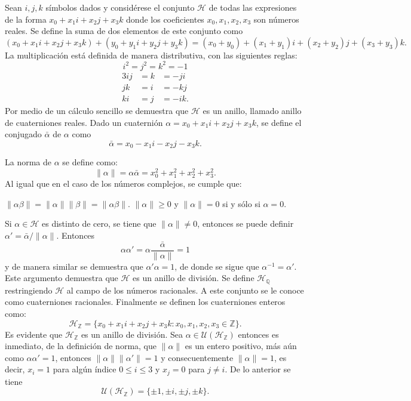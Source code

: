 \begin{ejemplo}
Sean $i,j,k$ símbolos dados y considérese el conjunto $\mathcal{H}$ de todas las expresiones de la forma $x_0 + x_1i+x_2j+x_3k$ donde los coeficientes $x_0,x_1,x_2,x_3$ son números reales.
Se define la suma de dos elementos de este conjunto como \[ (x_0 + x_1i+x_2j+x_3k)+(y_0 + y_1i+y_2j+y_3k) = (x_0 + y_0) + (x_1 + y_1)i + (x_2+y_2)j + (x_3+y_3)k.  \] La multiplicación está definida de manera distributiva, con las siguientes reglas:
\begin{equation*}
i^2 = j^2 = k^2 =-1
\end{equation*}
\vspace*{-5.1em}
\begin{alignat*}{3}
ij &= k &= -ji\\
jk &= i &= -kj\\
ki &= j &= -ik.
\end{alignat*}
 \indent Por medio de un cálculo sencillo se demuestra que $\mathcal{H}$ es un anillo, llamado anillo de cuaterniones reales. Dado un cuaternión $\alpha = x_0 + x_1i + x_2j + x_3k$, se define el conjugado $\bar{\alpha}$ de $\alpha$ como \[ \bar{\alpha} = x_0-x_1i - x_2j-x_3k. \] 
 
 La norma de $\alpha$ se define como: \[ \lVert \alpha \rVert = \alpha\bar{\alpha} = x_0 ^2 + x_1^2 + x_ 2^2 + x_ 3^2. \]
Al igual que en el caso de los números complejos, se cumple que:
\begin{bulletList}
\newItem $\lVert \alpha\beta \rVert = \lVert \alpha \rVert \lVert \beta \rVert = \lVert \alpha\beta \rVert$.
\newItem $\lVert \alpha \rVert \geq 0$ y $\lVert \alpha \rVert  = 0 $ si y sólo si $\alpha = 0 $.
\end{bulletList}

Si $\alpha \in \mathcal{H}$ es distinto de cero, se tiene que $\lVert \alpha \rVert \neq 0$, entonces se puede definir $\alpha' = \bar{\alpha}/\lVert \alpha \rVert$. Entonces \[ \alpha\alpha'= \alpha \frac{\bar{\alpha}}{\lVert \alpha \rVert} = 1 \] y de manera similar se demuestra que $\alpha'\alpha = 1$, de donde se sigue que $\alpha^{-1} = \alpha'$. Este argumento demuestra que $\mathcal{H}$ es un anillo de división.
Se define $\mathcal{H}_{\mathds{Q}}$ restringiendo $\mathcal{H}$ al campo de los números racionales. A este conjunto se le conoce como cuaterniones racionales.
Finalmente se definen los cuaterniones enteros como: \[ \mathcal{H}_{\mathds{Z}} = \{ x_0 + x_1i + x_2j + x_3k \colon x_0, x_1, x_2, x_3 \in \mathds{Z} \}. \]
\indent Es evidente que $\mathcal{H}_{\mathds{Z}}$ es un anillo de división.
Sea $\alpha \in \mathcal{U}(\mathcal{H}_{\mathds{Z}})$ entonces es inmediato, de la definición de norma, que $\lVert \alpha \rVert$ es un entero positivo, más aún como $\alpha\alpha'= 1$, entonces $\lVert \alpha \rVert \lVert \alpha'\rVert = 1$ y consecuentemente $\lVert \alpha \rVert = 1$, es decir, $x_i = 1$ para algún índice $0\leq i \leq 3 $ y $x_j = 0 $ para $j \neq i$. De lo anterior se tiene \[ \mathcal{U}(\mathcal{H}_{\mathds{Z}}) = \{ \pm1, \pm i, \pm j, \pm k \}. \] 
\end{ejemplo} 
